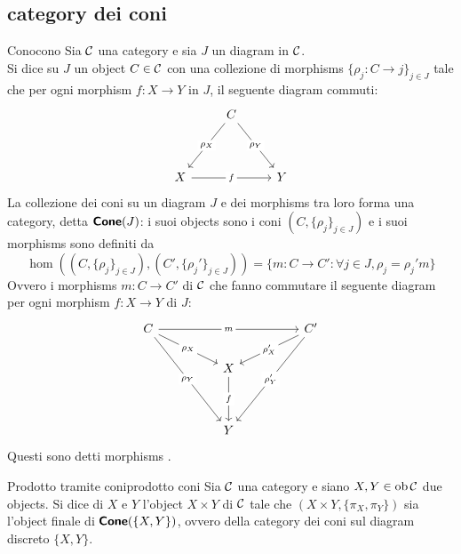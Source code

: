 \documentclass{article}
\renewcommand\C{\mc{C}}
\begin{document}
\subsection{category dei coni}

\begin{definition}{Cono}{cono}
    Sia $\C$ una category e sia $J$ un diagram in $\C$.\\
    Si dice  su $J$ un object $C \in \C$ con una collezione di morphisms $\{\rho_j : C \to j\}_{j \in J}$ tale che per ogni morphism $f : X\to Y$ in $J$, il seguente diagram commuti:
    \[\begin{tikzcd}
	    & C \\
	    \\
	    X && Y
	    \arrow["{\rho_X}"{description}, from=1-2, to=3-1]
	    \arrow["{\rho_Y}"{description}, from=1-2, to=3-3]
	    \arrow["f"{description}, from=3-1, to=3-3]
    \end{tikzcd}\]
    La collezione dei coni su un diagram $J$ e dei morphisms tra loro forma una category, detta $\text{\sffamily\textbf{Cone}}(J)$: i suoi objects sono i coni $(C,\{\rho_j\}_{j \in J})$ e i suoi morphisms sono definiti da 
    \[ \hom((C,\{\rho_j\}_{j \in J}), (C',\{\rho_j'\}_{j \in J})) = \{m : C\to C' : \forall j \in J, \rho_j = \rho_j' m\}\]
    Ovvero i morphisms $m:C\to C'$ di $\C$ che fanno commutare il seguente diagram per ogni morphism $f:X\to Y$ di $J$:
    \[\begin{tikzcd}
	    C &&&& {C'} \\
	    && X \\
    	\\
    	&& Y
    	\arrow["m"{description}, from=1-1, to=1-5]
    	\arrow["{\rho_X}"{description}, from=1-1, to=2-3]
    	\arrow["{\rho_Y}"{description}, from=1-1, to=4-3]
    	\arrow["{\rho_X'}"{description}, from=1-5, to=2-3]
    	\arrow["{\rho_Y'}"{description}, from=1-5, to=4-3]
	    \arrow["f"{description}, from=2-3, to=4-3]
    \end{tikzcd}\]
    Questi sono detti morphisms .
\end{definition}

\begin{definition}{Prodotto tramite coni}{prodotto coni}
    Sia $\C$ una category e siano $X,Y \in \ob\C$ due objects.
    Si dice  di $X$ e $Y$ l'object $X\times Y$ di $\C$ tale che $(X\times Y, \{\pi_X, \pi_Y\})$ sia l'object finale di $\text{\sffamily\textbf{Cone}}(\{X,Y\})$, ovvero della category dei coni sul diagram discreto $\{X,Y\}$.
\end{definition}
\end{document}
